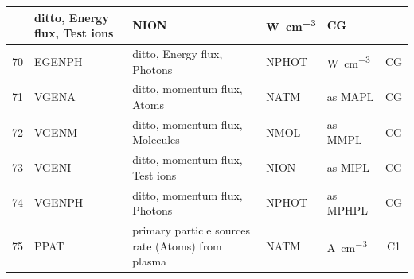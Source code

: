 \begin{landscape}
\begin{longtable}{|r|l|l|l|l|c|}
                                                                   & ditto, Energy flux, Test
    ions                                                           & NION                      & \si{\watt\per\cubic\centi\metre}
                                                                   & CG
    \\ \hline
    70                                                             & EGENPH
                                                                   & ditto, Energy flux,
    Photons                                                        & NPHOT                     &
    \si{\watt\per\cubic\centi\metre}                               & CG
    \\ \hline
    71                                                             & VGENA
                                                                   & ditto, momentum flux,
    Atoms                                                          & NATM                      & as MAPL
                                                                   & CG
    \\ \hline
    72                                                             & VGENM
                                                                   & ditto, momentum flux,
    Molecules                                                      & NMOL                      & as MMPL
                                                                   & CG
    \\ \hline
    73                                                             & VGENI
                                                                   & ditto, momentum flux, Test
    ions                                                           & NION                      & as MIPL
                                                                   & CG
    \\ \hline
    74                                                             & VGENPH
                                                                   & ditto, momentum flux,
    Photons                                                        & NPHOT                     & as MPHPL
                                                                   & CG
    \\ \hline
    75                                                             & PPAT
                                                                   & primary particle sources
    rate (Atoms) from plasma                                       & NATM                      &
    \si{\ampere\per\cubic\centi\metre}                             & C1

\end{longtable}
\end{landscape}
